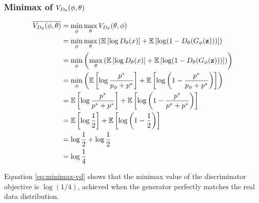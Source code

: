\subsubsection{Minimax of $V_{D_\theta}(\phi, \theta)$}
\label{sec:minimax-vd}
\begin{align}
  \overline{V_{D_\theta}(\phi, \theta)} & = \min_{\mathbf{\phi}}\max_{\mathbf{\theta}}
                    V_{D_\theta}(\theta, \phi) \nonumber \\
                  & = \min_{\mathbf{\phi}}\max_{\mathbf{\theta}} \left (
                    \mathbb{E}\left[\log{D_\theta(x)}\right] +
                    \mathbb{E}\left[\log(1 -
                    D_\theta(G_\phi(\mathbf{z})))\right] \right) \nonumber \\
                  & = \min_{\mathbf{\phi}}\left(\max_{\mathbf{\theta}} \left (
                    \mathbb{E}\left[\log{D_\theta(x)}\right] +
                    \mathbb{E}\left[\log(1 -
                    D_\theta(G_\phi(\mathbf{z})))\right] \right)
                    \right) \nonumber \\
                  & = \min_{\phi}\left(\mathbb{E}\left[\log{p^*\over
                    p_{\phi}+ p^*}\right] + \mathbb{E}\left[\log\left(1 - {p^* \over
                    p_{\phi} + p^*}\right)\right] \right) \nonumber \\
                  & = \mathbb{E}\left[\log{p^*\over p^*+ p^*}\right] +
                    \mathbb{E}\left[\log\left(1 - {p^* \over
                    p^* + p^*}\right)\right] \nonumber \\
                  & = \mathbb{E}\left[\log{1 \over 2}\right] +
                    \mathbb{E}\left[\log{\left(1 - {1 \over 2}\right)}\right] \nonumber \\
                  & = \log{1 \over 2} + \log{1 \over 2} \nonumber \\
                  & = \log{1 \over 4} \label{eq:minimax-vd}
\end{align}

Equation \ref{eq:minimax-vd} shows that the minimax value of the discriminator objective is $\log(1/4)$, achieved when the generator perfectly matches the real data distribution.

